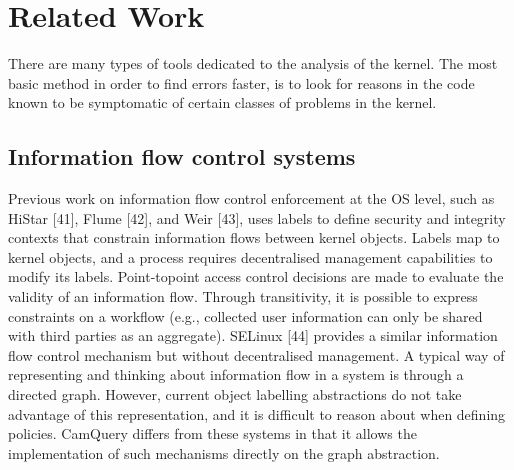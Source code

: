 \section{Related Work}
There are many types of tools dedicated to the analysis of the kernel. The most basic method in order to find errors faster, is to look for reasons in the code known to be symptomatic of certain classes of problems in the kernel.
\subsection{Information flow control systems}
Previous work on information flow control enforcement at the OS level, such as HiStar [41],
Flume [42], and Weir [43], uses labels to define security and integrity contexts that constrain information flows between kernel
objects. Labels map to kernel objects, and a process requires decentralised management capabilities to modify its labels. Point-topoint access control decisions are made to evaluate the validity
of an information flow. Through transitivity, it is possible to express constraints on a workflow (e.g., collected user information
can only be shared with third parties as an aggregate). SELinux [44]
provides a similar information flow control mechanism but without decentralised management. A typical way of representing and
thinking about information flow in a system is through a directed
graph. However, current object labelling abstractions do not take
advantage of this representation, and it is difficult to reason about
when defining policies. CamQuery differs from these systems in that it allows the implementation of such mechanisms directly on the
graph abstraction.